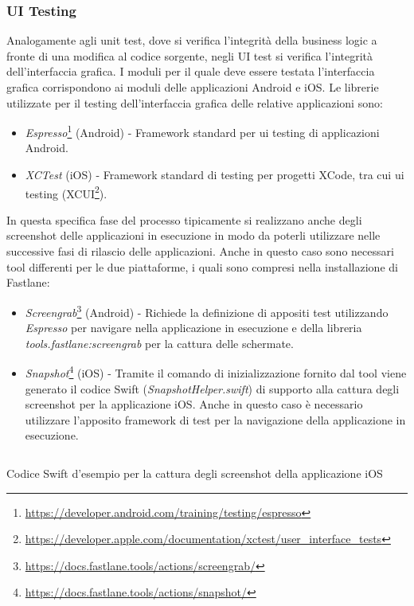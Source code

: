 \subsubsection{UI Testing}
Analogamente agli unit test, dove si verifica l'integrità della business logic a fronte di una modifica al codice sorgente, negli UI test si verifica l'integrità dell'interfaccia grafica. I moduli per il quale deve essere testata l'interfaccia grafica corrispondono ai moduli delle applicazioni Android e iOS. Le librerie utilizzate per il testing dell'interfaccia grafica delle relative applicazioni sono:
\begin{itemize}
    \item \textit{Espresso}\footnote{\url{https://developer.android.com/training/testing/espresso}} (Android) - Framework standard per ui testing di applicazioni Android.
    \item \textit{XCTest} (iOS) - Framework standard di testing per progetti XCode, tra cui ui testing (XCUI\footnote{\url{https://developer.apple.com/documentation/xctest/user_interface_tests}}).
\end{itemize}
In questa specifica fase del processo tipicamente si realizzano anche degli screenshot delle applicazioni in esecuzione in modo da poterli utilizzare nelle successive fasi di rilascio delle applicazioni. Anche in questo caso sono necessari tool differenti per le due piattaforme, i quali sono compresi nella installazione di Fastlane:
\begin{itemize}
    \item \textit{Screengrab}\footnote{\url{https://docs.fastlane.tools/actions/screengrab/}} (Android) - Richiede la definizione di appositi test utilizzando \textit{Espresso} per navigare nella applicazione in esecuzione e della libreria \textit{tools.fastlane:screengrab} per la cattura delle schermate.
    \item \textit{Snapshot}\footnote{\url{https://docs.fastlane.tools/actions/snapshot/}} (iOS) - Tramite il comando di inizializzazione fornito dal tool viene generato il codice Swift (\textit{SnapshotHelper.swift}) di supporto alla cattura degli screenshot per la applicazione iOS. Anche in questo caso è necessario utilizzare l'apposito framework di test per la navigazione della applicazione in esecuzione.
\end{itemize}

\begin{listing}[H]
\inputminted{swift}{code/4-ios-screenshot}
\caption{Codice Swift d'esempio per la cattura degli screenshot della applicazione iOS}
\end{listing}

